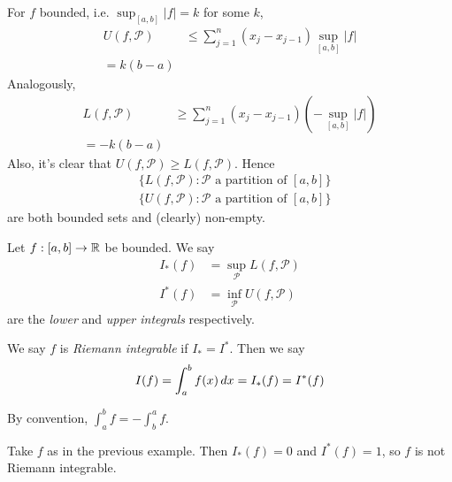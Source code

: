 \documentclass{../../template/note}
\begin{document}
    \begin{remark*}
        For \(f\) bounded, i.e. \(\sup_{[a, b]} |f| = k\) for some \(k\),
        \begin{align*}
            U(f, \mathcal P) &\leq \sum_{j=1}^n (x_j-x_{j-1})\sup_{[a,b]}|f| \\
            = k(b-a)
        \end{align*}
        Analogously,
        \begin{align*}
            L(f, \mathcal P) &\geq \sum_{j=1}^n (x_j-x_{j-1})(-\sup_{[a,b]}|f|) \\
            = -k(b-a)
        \end{align*}
        Also, it's clear that \(U(f, \mathcal P) \geq L(f, \mathcal P)\). Hence
        \begin{align*}
            &\{L(f, \mathcal P): \mathcal P \text{ a partition of }[a,b]\} \\
            &\{U(f, \mathcal P): \mathcal P \text{ a partition of }[a,b]\}
        \end{align*}
        are both bounded sets and (clearly) non-empty.        
    \end{remark*}
    
    \begin{definition}
        Let \(f: [a, b] \to \mathbb R\) be bounded. We say
        \begin{align*}
            I_*(f) &= \sup_{\mathcal P} L(f, \mathcal P) \\
            I^*(f) &= \inf_{\mathcal P} U(f, \mathcal P)
        \end{align*}
        are the \emph{lower} and \emph{upper integrals} respectively.        
    \end{definition}
    
    \begin{definition}
        We say \(f\) is \emph{Riemann integrable} if \(I_* = I^*\). Then we say
        \begin{align*}
            I(f) = \int_a^b f(x) \,d{x} = I_*(f) = I^*(f)
        \end{align*}
    \end{definition}
    
    \begin{remark*}
        By convention, \(\int_a^b f = -\int_b^a f\).
    \end{remark*}
    
    \begin{example*}
        Take \(f\) as in the previous example. Then \(I_*(f) = 0\) and \(I^*(f) = 1\), so \(f\) is not Riemann integrable.
    \end{example*}
    
\end{document}
